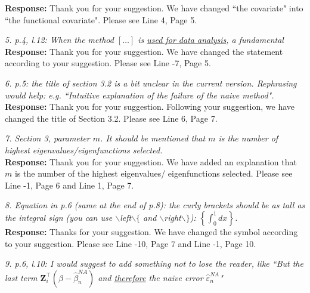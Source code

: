 \documentclass[12pt]{report}
\begin{document}
\begin{description}
{ \bf Response: } Thank you for your suggestion. We have changed ``the  covariate" into ``the functional covariate". Please see Line 4, Page 5.\\

\item {{ \textcolor[rgb]{0.00,0.50,1.00}{\em 5.  p.4, l.12: When the method $[\ldots]$ is \uline{used for data analysis}, a fundamental}}}\\

{ \bf Response: } Thank you for your suggestion. We have changed the statement according to your suggestion. Please see Line -7, Page 5.\\

\item {{ \textcolor[rgb]{0.00,0.50,1.00}{\em 6. p.5: the title of section 3.2 is a bit unclear in the current version. Rephrasing would help:
e.g. ``Intuitive explanation of the failure of the naive method". }}}\\

{ \bf Response: } Thank you for your suggestion. Following your suggestion,  we have changed the title of Section 3.2. Please see Line 6, Page 7. \\

\item {{ \textcolor[rgb]{0.00,0.50,1.00}{\em 7. Section 3, parameter $m$. It should be mentioned that $m$ is the number of highest eigenvalues/eigenfunctions selected. }}}\\

{ \bf Response: } Thank you for your suggestion. We have added  an explanation that $m$  is the number of the highest eigenvalues/
eigenfunctions selected. Please see Line -1, Page 6 and Line 1, Page 7.\\

\item {{ \textcolor[rgb]{0.00,0.50,1.00}{\em 8. Equation in p.6 (same at the end of p.8): the curly brackets should be as tall as the integral
sign (you can use  $\backslash$left$\backslash \{$ and $\backslash$right$\backslash \}$):
$\left\{\int_0^1 dx \right\}$.
}}}\\

{ \bf Response: } Thanks for your suggestion. We have changed the symbol according to your suggestion. Please see Line -10, Page 7 and Line -1, Page 10.\\

\item {{ \textcolor[rgb]{0.00,0.50,1.00}{\em 9.  p.6, l.10: I would suggest to add something not to lose the reader, like ``But the last term
$\mathbf{Z}_i^{\top}(\beta-\hat{\beta}_n^{NA})$ and \uline{therefore} the naive error $\hat{\varepsilon}^{NA}_n$" }}}\\


\end{description}
\end{document}
